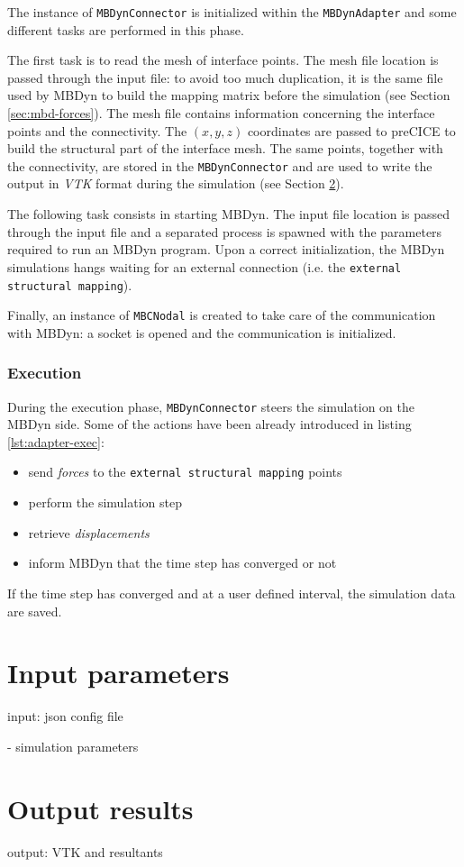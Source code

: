 The instance of \texttt{MBDynConnector} is initialized within the \texttt{MBDynAdapter} and some different tasks are performed in this phase.

The first task is to read the mesh of interface points. The mesh file location is passed through the input file: to avoid too much duplication, it is the same file used by MBDyn to build the mapping matrix before the simulation (see Section \ref{sec:mbd-forces}). The mesh file contains information concerning the interface points and the connectivity. The $(x,y,z)$ coordinates are passed to preCICE to build the structural part of the interface mesh. The same points, together with the connectivity, are stored in the \texttt{MBDynConnector} and are used to write the output in \textit{VTK} format during the simulation (see Section \ref{sec:mbdyn-adapter-output}).

The following task consists in starting MBDyn. The input file location is passed through the input file and a separated process is spawned with the parameters required to run an MBDyn program. Upon a correct initialization, the MBDyn simulations hangs waiting for an external connection (i.e. the \texttt{external structural mapping}).

Finally, an instance of \texttt{MBCNodal} is created to take care of the communication with MBDyn: a socket is opened and the communication is initialized. 


\subsubsection{Execution}

During the execution phase, \texttt{MBDynConnector} steers the simulation on the MBDyn side. Some of the actions have been already introduced in listing \ref{lst:adapter-exec}:

\begin{itemize}
    \item send \textit{forces} to the \texttt{external structural mapping} points
    \item perform the simulation step
    \item retrieve \textit{displacements}
    \item inform MBDyn that the time step has converged or not
\end{itemize}

If the time step has converged and at a user defined interval, the simulation data are saved.


\section{Input parameters}
\label{sec:mbdyn-adapter-input}



input: json config file

- simulation parameters

\section{Output results}
\label{sec:mbdyn-adapter-output}

output: VTK and resultants
